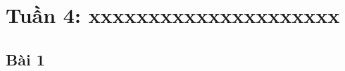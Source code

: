 \documentclass{article}
\begin{document}
\tableofcontents
\newpage
\listoffigures
\newpage
\section{Tuần 4: xxxxxxxxxxxxxxxxxxxxx}
\subsection{Bài 1}







\end{document}
